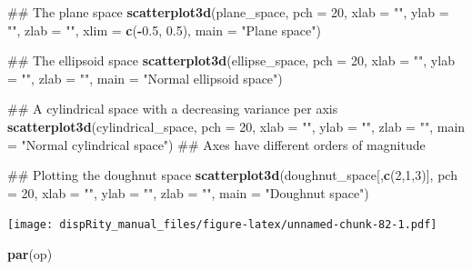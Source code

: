 \documentclass[]{book}
\newenvironment{Shaded}{\begin{snugshade}}{\end{snugshade}}
\newcommand{\KeywordTok}[1]{\textcolor[rgb]{0.13,0.29,0.53}{\textbf{#1}}}
\newcommand{\DataTypeTok}[1]{\textcolor[rgb]{0.13,0.29,0.53}{#1}}
\newcommand{\DecValTok}[1]{\textcolor[rgb]{0.00,0.00,0.81}{#1}}
\newcommand{\FloatTok}[1]{\textcolor[rgb]{0.00,0.00,0.81}{#1}}
\newcommand{\StringTok}[1]{\textcolor[rgb]{0.31,0.60,0.02}{#1}}
\newcommand{\OperatorTok}[1]{\textcolor[rgb]{0.81,0.36,0.00}{\textbf{#1}}}
\newcommand{\NormalTok}[1]{#1}
\theoremstyle{definition}
\theoremstyle{definition}
\theoremstyle{remark}
\begin{document}
\begin{Shaded}
\begin{Highlighting}[]
\NormalTok{## The plane space}
\KeywordTok{scatterplot3d}\NormalTok{(plane_space, }\DataTypeTok{pch =} \DecValTok{20}\NormalTok{, }\DataTypeTok{xlab =} \StringTok{""}\NormalTok{, }\DataTypeTok{ylab =} \StringTok{""}\NormalTok{, }\DataTypeTok{zlab =} \StringTok{""}\NormalTok{,}
              \DataTypeTok{xlim =} \KeywordTok{c}\NormalTok{(}\OperatorTok{-}\FloatTok{0.5}\NormalTok{, }\FloatTok{0.5}\NormalTok{), }\DataTypeTok{main =} \StringTok{"Plane space"}\NormalTok{)}

\NormalTok{## The ellipsoid space}
\KeywordTok{scatterplot3d}\NormalTok{(ellipse_space, }\DataTypeTok{pch =} \DecValTok{20}\NormalTok{, }\DataTypeTok{xlab =} \StringTok{""}\NormalTok{, }\DataTypeTok{ylab =} \StringTok{""}\NormalTok{, }\DataTypeTok{zlab =} \StringTok{""}\NormalTok{,}
              \DataTypeTok{main =} \StringTok{"Normal ellipsoid space"}\NormalTok{)}

\NormalTok{## A cylindrical space with a decreasing variance per axis}
\KeywordTok{scatterplot3d}\NormalTok{(cylindrical_space, }\DataTypeTok{pch =} \DecValTok{20}\NormalTok{, }\DataTypeTok{xlab =} \StringTok{""}\NormalTok{, }\DataTypeTok{ylab =} \StringTok{""}\NormalTok{, }\DataTypeTok{zlab =} \StringTok{""}\NormalTok{,}
              \DataTypeTok{main =} \StringTok{"Normal cylindrical space"}\NormalTok{)}
\NormalTok{## Axes have different orders of magnitude}

\NormalTok{## Plotting the doughnut space}
\KeywordTok{scatterplot3d}\NormalTok{(doughnut_space[,}\KeywordTok{c}\NormalTok{(}\DecValTok{2}\NormalTok{,}\DecValTok{1}\NormalTok{,}\DecValTok{3}\NormalTok{)], }\DataTypeTok{pch =} \DecValTok{20}\NormalTok{, }\DataTypeTok{xlab =} \StringTok{""}\NormalTok{, }\DataTypeTok{ylab =} \StringTok{""}\NormalTok{,}
              \DataTypeTok{zlab =} \StringTok{""}\NormalTok{, }\DataTypeTok{main =} \StringTok{"Doughnut space"}\NormalTok{)}
\end{Highlighting}
\end{Shaded}

\texttt{[image: dispRity\_manual\_files/figure-latex/unnamed-chunk-82-1.pdf]}

\begin{Shaded}
\begin{Highlighting}[]
\KeywordTok{par}\NormalTok{(op)}
\end{Highlighting}
\end{Shaded}
\end{document}
